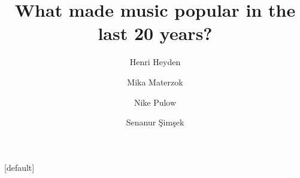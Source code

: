 

\usepackage[orientation=portrait,size=a0,scale=1.4]{beamerposter}
\usepackage{qrcode}
\usepackage{paracol}


\usepackage[pscoord]{eso-pic} %

[default] %

\newcommand{\placetextbox}[3]{%
  \setbox0=\hbox{#3}%
  \AddToShipoutPictureFG*{%
    \put(\LenToUnit{#1\paperwidth},\LenToUnit{#2\paperheight}){\vtop{{\null}\makebox[0pt][c]{#3}}}%
  }%
}%

\author[H. Heyden \and M. Materzok \and N. Pulow \and S. Şimşek]{Henri Heyden \and Mika Materzok \and Nike Pulow \and Senanur Şimşek}
\title{What made music popular in the last 20 years?}





